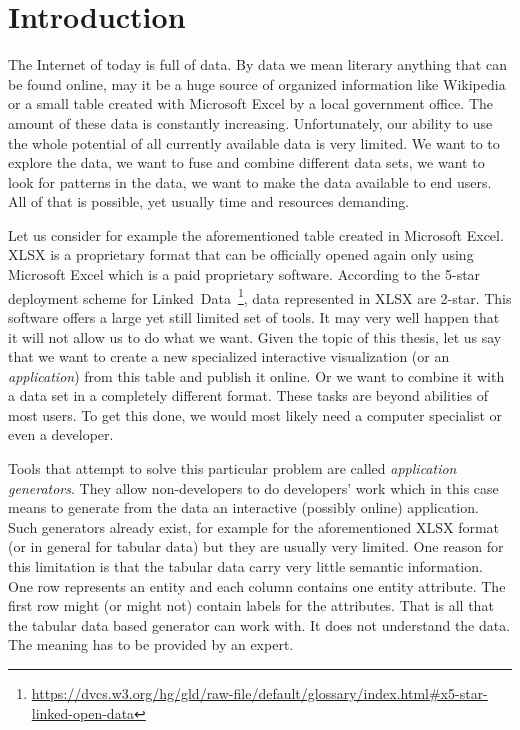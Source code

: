 \chapter*{Introduction}

The Internet of today is full of data. By data we mean literary anything that can be found online, may it be a huge source of organized information like Wikipedia or a small table created with Microsoft Excel by a local government office. The amount of these data is constantly increasing. Unfortunately, our ability to use the whole potential of all currently available data is very limited. We want to to explore the data, we want to fuse and combine different data sets, we want to look for patterns in the data, we want to make the data available to end users. All of that is possible, yet usually time and resources demanding. 

Let us consider for example the aforementioned table created in Microsoft Excel.  XLSX is a proprietary format that can be officially opened again only using Microsoft Excel which is a paid proprietary software. According to the 5-star deployment scheme for 
Linked~Data~\footnote{\url{https://dvcs.w3.org/hg/gld/raw-file/default/glossary/index.html\#x5-star-linked-open-data}}, 
data represented in XLSX are 2-star. This software offers a large yet still limited set of tools. It may very well happen that it will not allow us to do what we want. Given the topic of this thesis, let us say that we want to create a new specialized interactive visualization (or an \textit{application}) from this table and publish it online. Or we want to combine it with a data set in a completely different format. These tasks are beyond abilities of most users. To get this done,  we would most likely need a computer specialist or even a developer.

Tools that attempt to solve this particular problem are called \emph{application generators}. They allow non-developers to do developers' work which in this case means to generate from the data an interactive (possibly online) application. Such generators already exist, for example for the aforementioned XLSX format (or in general for tabular data) but they are usually very limited. One reason for this limitation is that the tabular data carry very little semantic information. One row represents an entity and each column contains one entity attribute. The first row might (or might not) contain labels for the attributes. That is all that the tabular data based generator can work with. It does not understand the data. The meaning has to be provided by an expert.

